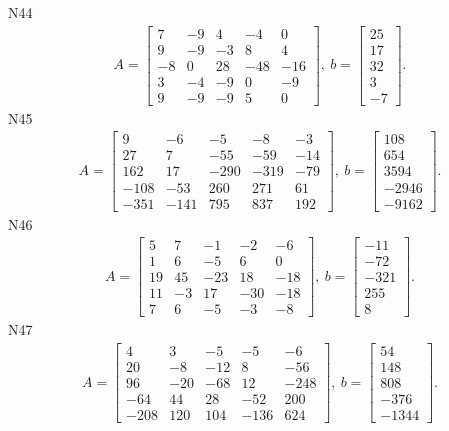 \documentclass[11pt]{report}
\begin{document}
N44
\begin{align*}
 A = \left[\begin{matrix}7 & -9 & 4 & -4 & 0\\9 & -9 & -3 & 8 & 4\\-8 & 0 & 28 & -48 & -16\\3 & -4 & -9 & 0 & -9\\9 & -9 & -9 & 5 & 0\end{matrix}\right],
\ b = \left[\begin{matrix}25\\17\\32\\3\\-7\end{matrix}\right]. 
 \end{align*}
N45
\begin{align*}
 A = \left[\begin{matrix}9 & -6 & -5 & -8 & -3\\27 & 7 & -55 & -59 & -14\\162 & 17 & -290 & -319 & -79\\-108 & -53 & 260 & 271 & 61\\-351 & -141 & 795 & 837 & 192\end{matrix}\right],
\ b = \left[\begin{matrix}108\\654\\3594\\-2946\\-9162\end{matrix}\right]. 
 \end{align*}
N46
\begin{align*}
 A = \left[\begin{matrix}5 & 7 & -1 & -2 & -6\\1 & 6 & -5 & 6 & 0\\19 & 45 & -23 & 18 & -18\\11 & -3 & 17 & -30 & -18\\7 & 6 & -5 & -3 & -8\end{matrix}\right],
\ b = \left[\begin{matrix}-11\\-72\\-321\\255\\8\end{matrix}\right]. 
 \end{align*}
N47
\begin{align*}
 A = \left[\begin{matrix}4 & 3 & -5 & -5 & -6\\20 & -8 & -12 & 8 & -56\\96 & -20 & -68 & 12 & -248\\-64 & 44 & 28 & -52 & 200\\-208 & 120 & 104 & -136 & 624\end{matrix}\right],
\ b = \left[\begin{matrix}54\\148\\808\\-376\\-1344\end{matrix}\right]. 
 \end{align*}
\end{document}
